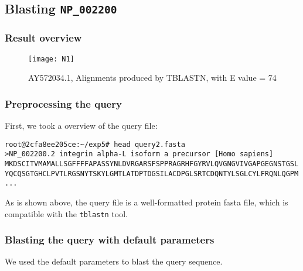 \documentclass[en,black,10pt,normal]{elegantnote}
\newcommand{\upcite}[1]{\textsuperscript{\textsuperscript{\cite{#1}}}}
\begin{document}
\subsection{Blasting \texttt{NP\_002200}}

\subsubsection{Result overview}

\begin{figure}[H]
    \centering
    \texttt{[image: N1]}
    \caption{AY572034.1, Alignments produced by TBLASTN, with E value = 74\upcite{wintersinger2015kablammo}}
    \label{N1}
\end{figure}

\subsubsection{Preprocessing the query}
First, we took a overview of the query file:
\begin{lstlisting}
root@2cfa8ee205ce:~/exp5# head query2.fasta 
>NP_002200.2 integrin alpha-L isoform a precursor [Homo sapiens]
MKDSCITVMAMALLSGFFFFAPASSYNLDVRGARSFSPPRAGRHFGYRVLQVGNGVIVGAPGEGNSTGSL
YQCQSGTGHCLPVTLRGSNYTSKYLGMTLATDPTDGSILACDPGLSRTCDQNTYLSGLCYLFRQNLQGPM
...
\end{lstlisting}
As is shown above, the query file is a well-formatted protein fasta file,
which is compatible with the \lstinline{tblastn} tool. 

\subsubsection{Blasting the query with default parameters}
We used the default parameters to blast the query sequence.
\end{document}
